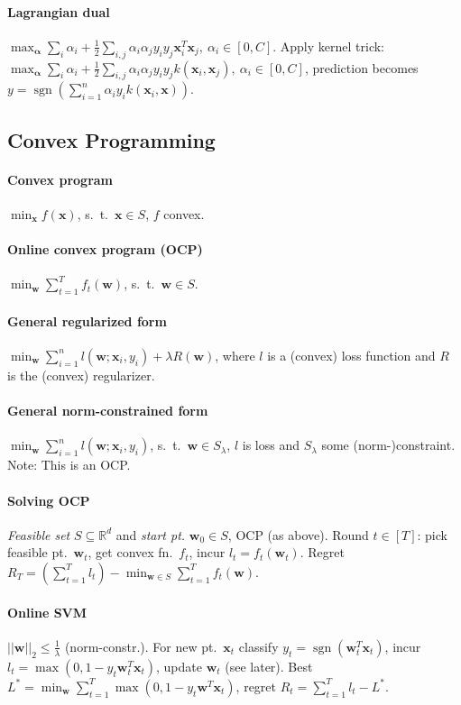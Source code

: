 \documentclass[11pt]{scrartcl}
\DeclareMathOperator{\sign}{sgn}
\newcommand{\R}{\mathbb{R}}
\begin{document}
\begin{multicols}{3}
\paragraph{Lagrangian dual}
$\max_{\bm \alpha} \sum_{i}\alpha_i + \frac{1}{2}\sum_{i,j}\alpha_i\alpha_j y_i y_j \bm x_i^T\bm x_j,\ \alpha_i \in [0,C]$.
Apply kernel trick: 
$\max_{\bm \alpha} \sum_{i}\alpha_i + \frac{1}{2}\sum_{i,j}\alpha_i\alpha_j y_i y_j k(\bm x_i, \bm x_j),\ \alpha_i \in [0,C]$, prediction becomes $y = \sign(\sum_{i=1}^{n}\alpha_i y_i k(\bm x_i,\bm x))$.

\subsection{Convex Programming}
\paragraph{Convex program} $\min_{\bm x} f(\bm x)$, s.\ t.\ $\bm x \in S$, $f$ convex.
\paragraph{Online convex program (OCP)} $\min_{\bm w} \sum_{t=1}^{T} f_t(\bm w)$, s.\ t.\ $\bm w \in S$.
\paragraph{General regularized form} $\min_{\bm w} \sum_{i=1}^{n} l(\bm w; \bm x_i, y_i) + \lambda R(\bm w)$, where $l$ is a (convex) loss function and $R$ is the (convex) regularizer.
\paragraph{General norm-constrained form} $\min_{\bm w} \sum_{i=1}^{n} l(\bm w; \bm x_i, y_i)$, s.\ t.\ $\bm w \in S_\lambda$, $l$ is loss and $S_\lambda$ some (norm-)constraint. Note: This is an OCP.

\paragraph{Solving OCP}
\emph{Feasible set} $S \subseteq \R^d$ and \emph{start pt.} $\bm w_0 \in S$, OCP (as above).
Round $t \in [T]$: pick feasible pt.\ $\bm w_t$, get convex fn.\ $f_t$, incur $l_t = f_t(\bm w_t)$.
Regret $R_T = (\sum_{t=1}^{T} l_t) - \min_{\bm w \in S}\sum_{t=1}^{T}f_t(\bm w)$.

\paragraph{Online SVM}
$||\bm w||_2 \leq \frac{1}{\lambda}$ (norm-constr.). For new pt.\ $\bm x_t$ classify $y_t = \sign(\bm w_t^T \bm x_t)$,
incur $l_t = \max(0,1-y_t \bm w_t^T \bm x_t)$, update $\bm w_t$ (see later).
Best $L^* = \min_{\bm w}\sum_{t=1}^{T}\max(0,1-y_t \bm w^T \bm x_t)$, regret $R_t = \sum_{t=1}^{T} l_t - L^*$.


\end{multicols}
\end{document}
